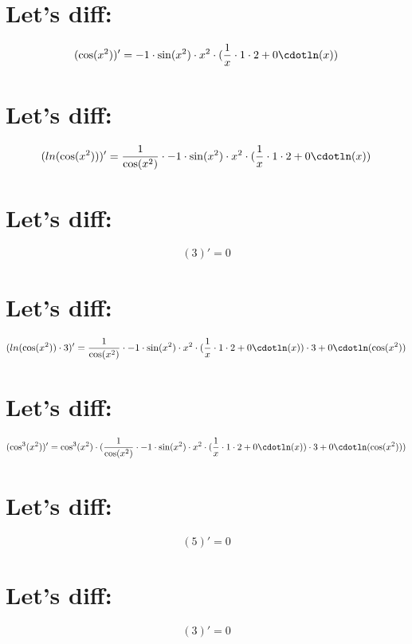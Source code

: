 \documentclass[a4paper,12pt]{article}
\begin{document}
\section{Let's diff:}
\begin{center}
	$$(\cos( x ^ 2 ))' =  -1 \cdot\sin( x ^ 2 )\cdot x ^ 2 \cdot(\frac 1  x \cdot 1 \cdot 2 + 0 \cdotln( x ))$$
\end{center}
\section{Let's diff:}
\begin{center}
	$$(ln(\cos( x ^ 2 )))' = \frac 1 {\cos( x ^ 2 )}\cdot -1 \cdot\sin( x ^ 2 )\cdot x ^ 2 \cdot(\frac 1  x \cdot 1 \cdot 2 + 0 \cdotln( x ))$$
\end{center}
\section{Let's diff:}
\begin{center}
	$$( 3 )' =  0 $$
\end{center}
\section{Let's diff:}
\begin{center}
	$$(ln(\cos( x ^ 2 ))\cdot 3 )' = \frac 1 {\cos( x ^ 2 )}\cdot -1 \cdot\sin( x ^ 2 )\cdot x ^ 2 \cdot(\frac 1  x \cdot 1 \cdot 2 + 0 \cdotln( x ))\cdot 3 + 0 \cdotln(\cos( x ^ 2 ))$$
\end{center}
\section{Let's diff:}
\begin{center}
	$$(\cos^{ 3 }( x ^ 2 ))' = \cos^{ 3 }( x ^ 2 )\cdot(\frac 1 {\cos( x ^ 2 )}\cdot -1 \cdot\sin( x ^ 2 )\cdot x ^ 2 \cdot(\frac 1  x \cdot 1 \cdot 2 + 0 \cdotln( x ))\cdot 3 + 0 \cdotln(\cos( x ^ 2 )))$$
\end{center}
\section{Let's diff:}
\begin{center}
	$$( 5 )' =  0 $$
\end{center}
\section{Let's diff:}
\begin{center}
	$$( 3 )' =  0 $$
\end{center}
\end{document}
